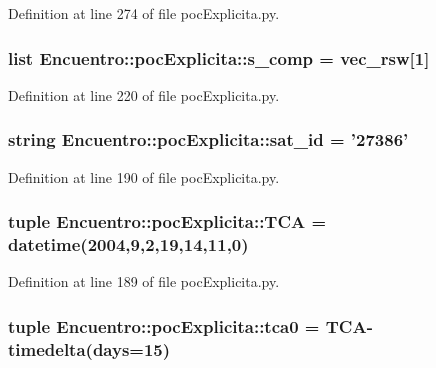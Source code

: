 \-Definition at line 274 of file poc\-Explicita.\-py.

\subsubsection[{s\-\_\-comp}]{\setlength{\rightskip}{0pt plus 5cm}list {\bf \-Encuentro\-::poc\-Explicita\-::s\-\_\-comp} = vec\-\_\-rsw[1]}\label{namespace_encuentro_1_1poc_explicita_ac1aa96f22c1a67b631ff6640675bf092}


\-Definition at line 220 of file poc\-Explicita.\-py.

\subsubsection[{sat\-\_\-id}]{\setlength{\rightskip}{0pt plus 5cm}string {\bf \-Encuentro\-::poc\-Explicita\-::sat\-\_\-id} = '27386'}\label{namespace_encuentro_1_1poc_explicita_a59c2fc21a0c43f5f8ed341a020272717}


\-Definition at line 190 of file poc\-Explicita.\-py.

\subsubsection[{\-T\-C\-A}]{\setlength{\rightskip}{0pt plus 5cm}tuple {\bf \-Encuentro\-::poc\-Explicita\-::\-T\-C\-A} = datetime(2004,9,2,19,14,11,0)}\label{namespace_encuentro_1_1poc_explicita_a88b7deb45405de2ec87cd1081fcbcacd}


\-Definition at line 189 of file poc\-Explicita.\-py.

\subsubsection[{tca0}]{\setlength{\rightskip}{0pt plus 5cm}tuple {\bf \-Encuentro\-::poc\-Explicita\-::tca0} = {\bf \-T\-C\-A}-\/timedelta(days=15)}\label{namespace_encuentro_1_1poc_explicita_a55513c4af70b07a6ed69997f131dad17}


